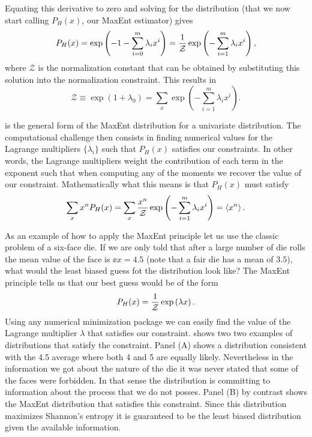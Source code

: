 Equating this derivative to zero and solving for the distribution (that we now
start calling $P_H(x)$, our MaxEnt estimator) gives
\begin{equation}
  P_H(x) = \exp \left(- 1 - \sum_{i=0}^m \lambda_i x^i \right)
         ={1 \over \mathcal{Z}}
         \exp \left( - \sum_{i=1}^m \lambda_i x^i \right),
  \label{eq_maxEnt}
\end{equation}
where $\mathcal{Z}$ is the normalization constant that can be obtained by
substituting this solution into the normalization constraint. This results in
\begin{equation}
  \mathcal{Z} \equiv \exp\left( 1 + \lambda_0 \right) =
  \sum_x \exp \left( - \sum_{i=1}^m \lambda_i x^i \right).
\end{equation}

 is the general form of the MaxEnt distribution for a univariate
distribution. The computational challenge then consists in finding numerical
values for the Lagrange multipliers $\{ \lambda_i \}$ such that $P_H(x)$
satisfies our constraints. In other words, the Lagrange multipliers weight the
contribution of each term in the exponent such that when computing any of the
moments we recover the value of our constraint. Mathematically what this means
is that $P_H(x)$ must satisfy
\begin{equation}
  \sum_x x^n P_H(x) =
  \sum_x {x^n \over \mathcal{Z}}
  \exp \left( - \sum_{i=1}^m \lambda_i x^i \right) = \left\langle x^n \right\rangle.
\end{equation}

As an example of how to apply the MaxEnt principle let us use the classic
problem of a six-face die. If we are only told that after a large number of die
rolls the mean value of the face is $\ee{x} = 4.5$ (note that a fair die has a
mean of $3.5$), what would the least biased guess fot the distribution look
like? The MaxEnt principle tells us that our best guess would be of the form
\begin{equation}
  P_H(x) = {1 \over \mathcal{Z}} \exp \left( \lambda x \right).
\end{equation}
Using any numerical minimization package we can easily find the value of the
Lagrange multiplier $\lambda$  that satisfies our constraint.
 shows two two examples of distributions that satisfy the
constraint. Panel (A) shows a distribution consistent with the 4.5 average where
both 4 and 5 are equally likely. Nevertheless in the information we got about
the nature of the die it was never stated that some of the faces were forbidden.
In that sense the distribution is committing to information about the process
that we do not posses. Panel (B) by contrast shows the MaxEnt distribution that
satisfies this constraint. Since this distribution maximizes Shannon's entropy
it is guaranteed to be the least biased distribution given the available
information.

